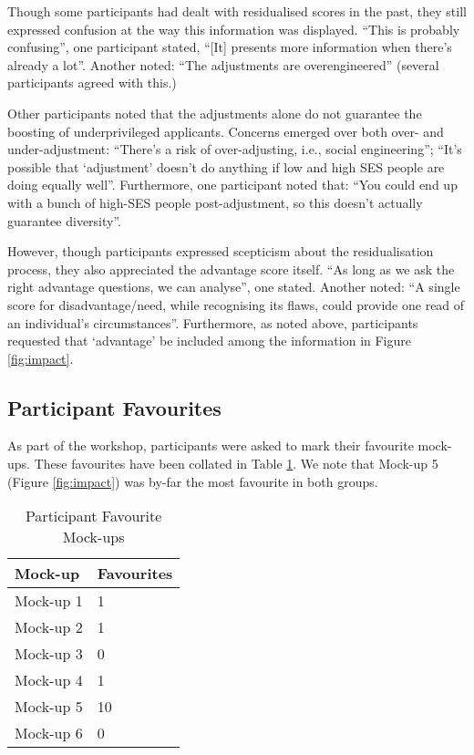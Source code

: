 Though some participants had dealt with residualised scores in the past, they still expressed confusion at the way this information was displayed. ``This is probably confusing'', one participant stated, ``[It] presents more information when there's already a lot''. Another noted: ``The adjustments are overengineered'' (several participants agreed with this.)

Other participants noted that the adjustments alone do not guarantee the boosting of underprivileged applicants. Concerns emerged over both over- and under-adjustment: ``There's a risk of over-adjusting, i.e., social engineering''; ``It's possible that `adjustment' doesn't do anything if low and high SES people are doing equally well''. Furthermore, one participant noted that: ``You could end up with a bunch of high-SES people post-adjustment, so this doesn't actually guarantee diversity''.

However, though participants expressed scepticism about the residualisation process, they also appreciated the advantage score itself. ``As long as we ask the right advantage questions, we can analyse'', one stated. Another noted: ``A single score for disadvantage/need, while recognising its flaws, could provide one read of an individual's circumstances''. Furthermore, as noted above, participants requested that `advantage' be included among the information in Figure \ref{fig:impact}.

\subsection{Participant Favourites}
As part of the workshop, participants were asked to mark their favourite mock-ups. These favourites have been collated in Table \ref{tab:favourites}. We note that Mock-up 5 (Figure \ref{fig:impact}) was by-far the most favourite in both groups.

\begin{table}[htbp]
    \centering
    \caption{Participant Favourite Mock-ups}
    \label{tab:favourites}
    \begin{tabularx}{\textwidth}{lX}
        \toprule
        \textbf{Mock-up} & \textbf{Favourites} \\
        \midrule
        Mock-up 1 & 1 \\
        Mock-up 2 & 1 \\
        Mock-up 3 & 0 \\
        Mock-up 4 & 1 \\
        Mock-up 5 & 10 \\
        Mock-up 6 & 0 \\
        \bottomrule
    \end{tabularx}
\end{table}

